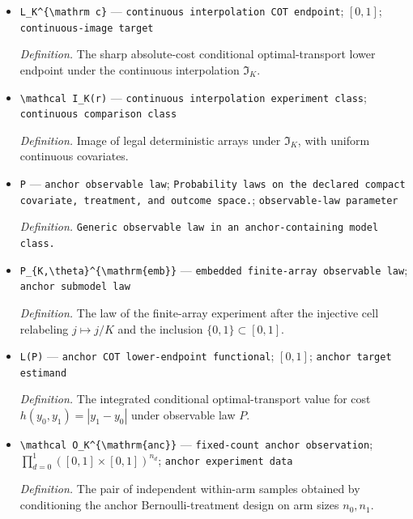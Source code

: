\documentclass{article}
\begin{document}
\begin{itemize}
  \item \texttt{L\_\allowbreak{}K\textasciicircum{}\{\textbackslash{}\allowbreak{}mathrm c\}\allowbreak{}} --- \texttt{continuous interpolation COT endpoint}; \([0,1]\); \texttt{continuous-\allowbreak{}image target}
  \par\smallskip\noindent\emph{Definition.} The sharp absolute-cost conditional optimal-transport lower endpoint under the continuous interpolation \(\mathfrak I_K\).
  \item \texttt{\textbackslash{}\allowbreak{}mathcal I\_\allowbreak{}K(r)} --- \texttt{continuous interpolation experiment class}; \texttt{continuous comparison class}
  \par\smallskip\noindent\emph{Definition.} Image of legal deterministic arrays under \(\mathfrak I_K\), with uniform continuous covariates.
  \item \texttt{P} --- \texttt{anchor observable law}; \texttt{Probability laws on the declared compact covariate,\allowbreak{} treatment,\allowbreak{} and outcome space.}; \texttt{observable-\allowbreak{}law parameter}
  \par\smallskip\noindent\emph{Definition.} \texttt{Generic observable law in an anchor-\allowbreak{}containing model class.}
  \item \texttt{P\_\allowbreak{}\{K,\allowbreak{}\textbackslash{}\allowbreak{}theta\}\allowbreak{}\textasciicircum{}\{\textbackslash{}\allowbreak{}mathrm\{emb\}\allowbreak{}\}\allowbreak{}} --- \texttt{embedded finite-\allowbreak{}array observable law}; \texttt{anchor submodel law}
  \par\smallskip\noindent\emph{Definition.} The law of the finite-array experiment after the injective cell relabeling \(j\mapsto j/K\) and the inclusion \(\{0,1\}\subset[0,1]\).
  \item \texttt{L(P)} --- \texttt{anchor COT lower-\allowbreak{}endpoint functional}; \([0,1]\); \texttt{anchor target estimand}
  \par\smallskip\noindent\emph{Definition.} The integrated conditional optimal-transport value for cost \(h(y_0,y_1)=|y_1-y_0|\) under observable law \(P\).
  \item \texttt{\textbackslash{}\allowbreak{}mathcal O\_\allowbreak{}K\textasciicircum{}\{\textbackslash{}\allowbreak{}mathrm\{anc\}\allowbreak{}\}\allowbreak{}} --- \texttt{fixed-\allowbreak{}count anchor observation}; \(\prod_{d=0}^1([0,1]\times[0,1])^{n_d}\); \texttt{anchor experiment data}
  \par\smallskip\noindent\emph{Definition.} The pair of independent within-arm samples obtained by conditioning the anchor Bernoulli-treatment design on arm sizes \(n_0,n_1\).

\end{itemize}
\end{document}
